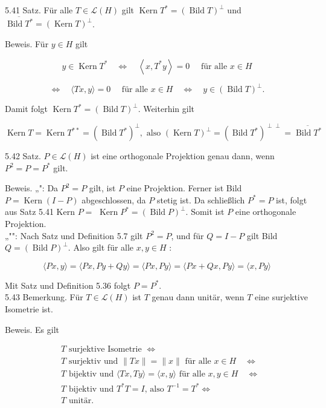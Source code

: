 \documentclass[10pt, letterpaper]{article}
\begin{document}
5.41 Satz. Für alle $T \in \mathcal{L}(H)$ gilt $\operatorname{Kern} T^{*}=(\operatorname{Bild} T)^{\perp}$ und $\overline{\operatorname{Bild} T^{*}}=(\operatorname{Kern} T)^{\perp}$.

Beweis. Für $y \in H$ gilt

$$
y \in \operatorname{Kern} T^{*} \quad \Longleftrightarrow \quad\left\langle x, T^{*} y\right\rangle=0 \quad \text { für alle } x \in H
$$

$$
\Longleftrightarrow \quad\langle T x, y\rangle=0 \quad \text { für alle } x \in H \quad \Longleftrightarrow \quad y \in(\operatorname{Bild} T)^{\perp} .
$$

Damit folgt $\operatorname{Kern} T^{*}=(\operatorname{Bild} T)^{\perp}$. Weiterhin gilt

$$
\operatorname{Kern} T=\operatorname{Kern} T^{* *}=\left(\operatorname{Bild} T^{*}\right)^{\perp}, \text { also }(\operatorname{Kern} T)^{\perp}=\left(\operatorname{Bild} T^{*}\right)^{\perp \perp}=\overline{\operatorname{Bild} T^{*}}
$$

5.42 Satz. $P \in \mathcal{L}(H)$ ist eine orthogonale Projektion genau dann, wenn $P^{2}=P=P^{*}$ gilt.

Beweis. „": Da $P^{2}=P$ gilt, ist $P$ eine Projektion. Ferner ist Bild $P=\operatorname{Kern}(I-P)$ abgeschlossen, da $P$ stetig ist. Da schließlich $P^{*}=P$ ist, folgt aus Satz 5.41 Kern $P=$ $\operatorname{Kern} P^{*}=(\operatorname{Bild} P)^{\perp}$. Somit ist $P$ eine orthogonale Projektion.\\
„"": Nach Satz und Definition 5.7 gilt $P^{2}=P$, und für $Q=I-P$ gilt Bild $Q=(\operatorname{Bild} P)^{\perp}$. Also gilt für alle $x, y \in H$ :

$$
\langle P x, y\rangle=\langle P x, P y+Q y\rangle=\langle P x, P y\rangle=\langle P x+Q x, P y\rangle=\langle x, P y\rangle
$$

Mit Satz und Definition 5.36 folgt $P=P^{*}$.\\
5.43 Bemerkung. Für $T \in \mathcal{L}(H)$ ist $T$ genau dann unitär, wenn $T$ eine surjektive Isometrie ist.

Beweis. Es gilt

$$
\begin{aligned}
& T \text { surjektive Isometrie } \Longleftrightarrow \\
& T \text { surjektiv und }\|T x\|=\|x\| \text { für alle } x \in H \quad \Longleftrightarrow \\
& T \text { bijektiv und }\langle T x, T y\rangle=\langle x, y\rangle \text { für alle } x, y \in H \quad \Longleftrightarrow \\
& T \text { bijektiv und } T^{*} T=I \text {, also } T^{-1}=T^{*} \Longleftrightarrow \\
& T \text { unitär. }
\end{aligned}
$$
\end{document}
